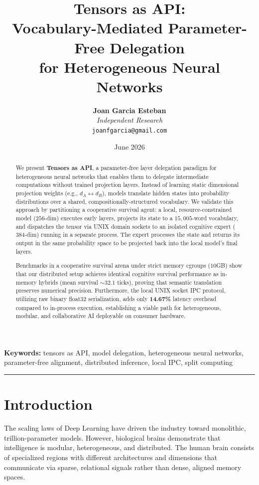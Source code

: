 \documentclass{article}
\title{\textbf{Tensors as API:\\Vocabulary-Mediated Parameter-Free Delegation\\for Heterogeneous Neural Networks}}
\author{\textbf{Joan Garcia Esteban} \\ \textit{Independent Research} \\ \texttt{joanfgarcia@gmail.com}}
\date{June 2026}
\begin{document}
\maketitle

\begin{abstract}
We present \textbf{Tensors as API}, a parameter-free layer delegation paradigm for heterogeneous neural networks that enables them to delegate intermediate computations without trained projection layers. Instead of learning static dimensional projection weights (e.g., $d_A \leftrightarrow d_B$), models translate hidden states into probability distributions over a shared, compositionally-structured vocabulary. We validate this approach by partitioning a cooperative survival agent: a local, resource-constrained model ($256$-dim) executes early layers, projects its state to a $15,005$-word vocabulary, and dispatches the tensor via UNIX domain sockets to an isolated cognitive expert ($384$-dim) running in a separate process. The expert processes the state and returns its output in the same probability space to be projected back into the local model's final layers. 

Benchmarks in a cooperative survival arena under strict memory cgroups ($10$GB) show that our distributed setup achieves identical cognitive survival performance as in-memory hybrids (mean survival $\sim 32.1$ ticks), proving that semantic translation preserves numerical precision. Furthermore, the local UNIX socket IPC protocol, utilizing raw binary float32 serialization, adds only \textbf{14.67\%} latency overhead compared to in-process execution, establishing a viable path for heterogeneous, modular, and collaborative AI deployable on consumer hardware.
\end{abstract}

\textbf{Keywords:} tensors as API, model delegation, heterogeneous neural networks, parameter-free alignment, distributed inference, local IPC, split computing

\hrule

\section{Introduction}

The scaling laws of Deep Learning have driven the industry toward monolithic, trillion-parameter models. However, biological brains demonstrate that intelligence is modular, heterogeneous, and distributed. The human brain consists of specialized regions with different architectures and dimensions that communicate via sparse, relational signals rather than dense, aligned memory spaces. 
\end{document}
